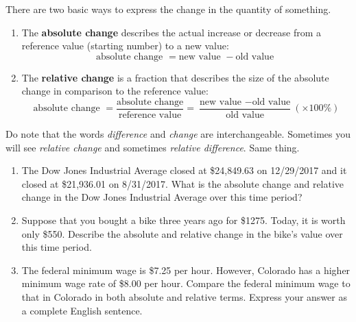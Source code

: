 \documentclass[12pt]{article}
\begin{document}
There are two basic ways to express the change in the quantity of something.
\begin{enumerate}
\item The \textbf{absolute change} describes the actual increase or decrease from a reference value (starting number) to a new value:
$$ \text{absolute change } = \text{new value } - \text{old value }$$
\item The \textbf{relative change} is a fraction that describes the size of the absolute change in comparison to the reference value:
$$ \text{absolute change } = \frac{ \text{absolute change}}{\text{reference value}} =  \frac{ \text{new value } - \text{old value} }{ \text{old value} } (\times 100\%)$$
\end{enumerate}
Do note that the words \emph{difference} and \emph{change} are interchangeable. 
Sometimes you will see \emph{relative change} and sometimes \emph{relative difference}. Same thing.
\pagebreak

\begin{enumerate}
\item The Dow Jones Industrial Average closed at \$24,849.63 on 12/29/2017 and it closed at \$21,936.01 on 8/31/2017.  What is the absolute change and relative change in the Dow Jones Industrial Average over this time period?
\vspace{0.75in}

\item Suppose that you bought a bike three years ago for \$1275. Today, it is worth only \$550. Describe the absolute and relative change in the bike’s value over this time period.
\vspace{0.75in}

\item The federal minimum wage is \$7.25 per hour. However, Colorado has a higher minimum wage rate of \$8.00 per hour. Compare the federal minimum wage to that in Colorado in both absolute and relative terms. Express your answer as a complete English sentence.
\vspace{0.75in}

\end{enumerate}
\end{document}
